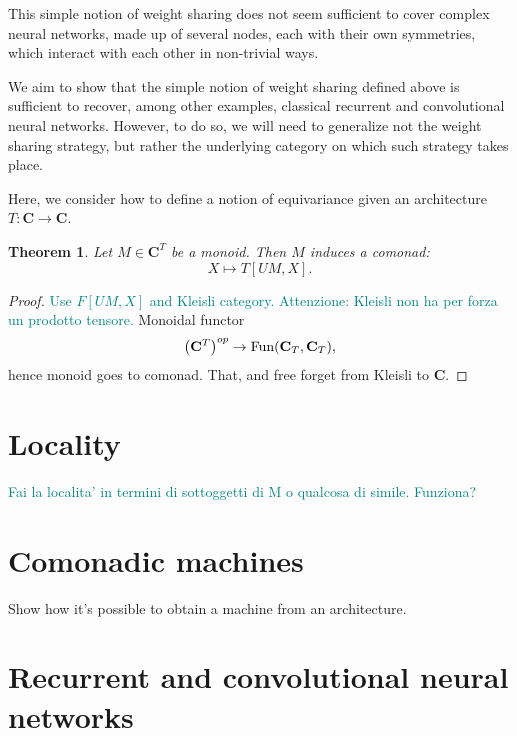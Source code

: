 \documentclass[12pt]{article}
\newtheorem{theorem}{Theorem}
\newcommand{\pietro}[1]{\textcolor{teal}{#1}}
\newcommand{\Fun}{{\textnormal{Fun}}}
\newcommand{\Cat}{{\mathbf{C}}}
\begin{document}
This simple notion of weight sharing does not seem sufficient to cover complex neural networks, made up of several nodes, each with their own symmetries, which interact with each other in non-trivial ways.

We aim to show that the simple notion of weight sharing defined above is sufficient to recover, among other examples, classical recurrent and convolutional neural networks. However, to do so, we will need to generalize not the weight sharing strategy, but rather the underlying category on which such strategy takes place.

Here, we consider how to define a notion of equivariance given an architecture $T\colon\Cat \rightarrow \Cat$.

\begin{theorem}\label{thm:weight_sharing}
    Let $M \in \Cat^T$ be a monoid. Then $M$ induces a comonad:
    \begin{equation*}
        X \mapsto T[UM, X].
    \end{equation*}
\end{theorem}

\begin{proof}
    \pietro{Use $F[UM, X]$ and Kleisli category. Attenzione: Kleisli non ha per forza un prodotto tensore.} Monoidal functor
    \begin{equation*}
        \left(\Cat^T\right)^{op} \rightarrow \Fun(\Cat_T, \Cat_T),
    \end{equation*}
    hence monoid goes to comonad. That, and free forget from Kleisli to $\Cat$.
\end{proof}

\section{Locality}

\pietro{Fai la localita' in termini di sottoggetti di M o qualcosa di simile. Funziona?}

\section{Comonadic machines}

Show how it's possible to obtain a machine from an architecture.

\section{Recurrent and convolutional neural networks}
\end{document}
